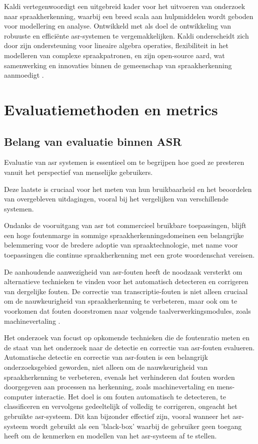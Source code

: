 Kaldi vertegenwoordigt een uitgebreid kader voor het uitvoeren van onderzoek naar spraakherkenning, waarbij een breed scala aan hulpmiddelen wordt geboden voor modellering en analyse. Ontwikkeld met als doel de ontwikkeling van robuuste en efficiënte \gls{asr}-systemen te vergemakkelijken. Kaldi onderscheidt zich door zijn ondersteuning voor lineaire algebra operaties, flexibiliteit in het modelleren van complexe spraakpatronen, en zijn open-source aard, wat samenwerking en innovaties binnen de gemeenschap van spraakherkenning aanmoedigt \autocite{Povey_ASRU2011}.


\section{Evaluatiemethoden en metrics}
\subsection{Belang van evaluatie binnen ASR}
Evaluatie van \gls{asr} systemen is essentieel 
om te begrijpen hoe goed ze presteren vanuit het perspectief van menselijke gebruikers.

 Deze laatste is cruciaal voor het meten van hun bruikbaarheid en het beoordelen van overgebleven uitdagingen, vooral bij het vergelijken van verschillende systemen. 

Ondanks de vooruitgang van \gls{asr} tot commercieel bruikbare toepassingen, blijft een hoge foutenmarge in sommige spraakherkenningsdomeinen een belangrijke belemmering voor de bredere adoptie van spraaktechnologie, met name voor toepassingen die continue spraakherkenning met een grote woordenschat vereisen.

De aanhoudende aanwezigheid van \gls{asr}-fouten heeft de noodzaak versterkt om alternatieve technieken te vinden voor het automatisch detecteren en corrigeren van dergelijke fouten. De correctie van transcriptie-fouten is niet alleen cruciaal om de nauwkeurigheid van spraakherkenning te verbeteren, maar ook om te voorkomen dat fouten doorstromen naar volgende taalverwerkingsmodules, zoals machinevertaling \autocite{Errattahi_2018}.

Het onderzoek van \textcite{Errattahi_2018} focust op opkomende technieken die de foutenratio meten en de staat van het onderzoek naar de detectie en correctie van \gls{asr}-fouten evalueren. Automatische detectie en correctie van \gls{asr}-fouten is een belangrijk onderzoeksgebied geworden, niet alleen om de nauwkeurigheid van spraakherkenning te verbeteren, evenals het verhinderen dat fouten worden doorgegeven aan processen na herkenning, zoals machinevertaling en mens-computer interactie. Het doel is om fouten automatisch te detecteren, te classificeren en vervolgens gedeeltelijk of volledig te corrigeren, ongeacht het gebruikte \gls{asr}-systeem. Dit kan bijzonder effectief zijn, vooral wanneer het \gls{asr}-systeem wordt gebruikt als een 'black-box' waarbij de gebruiker geen toegang heeft om de kenmerken en modellen van het \gls{asr}-systeem af te stellen.

